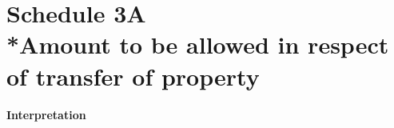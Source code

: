 \documentclass[12pt,a4paper]{article}
\begin{document}
\part[Schedule 3A --- Amount to be allowed in respect of transfer of property]{Schedule 3A\\*Amount to be allowed in respect of transfer of property}

\renewcommand\parthead{--- Schedule 3A}


\subsection*{Interpretation}
\end{document}

